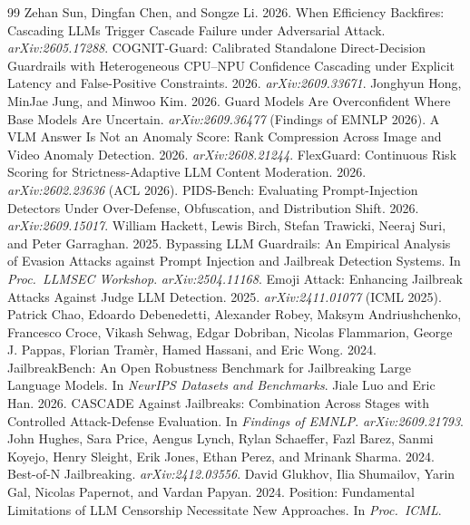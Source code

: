 \documentclass[11pt]{article}
\begin{document}
\begin{thebibliography}{99}
 Zehan Sun, Dingfan Chen, and Songze Li. 2026. When Efficiency Backfires: Cascading LLMs Trigger Cascade Failure under Adversarial Attack. \emph{arXiv:2605.17288}.
 COGNIT-Guard: Calibrated Standalone Direct-Decision Guardrails with Heterogeneous CPU--NPU Confidence Cascading under Explicit Latency and False-Positive Constraints. 2026. \emph{arXiv:2609.33671}.
 Jonghyun Hong, MinJae Jung, and Minwoo Kim. 2026. Guard Models Are Overconfident Where Base Models Are Uncertain. \emph{arXiv:2609.36477} (Findings of EMNLP 2026).
 A VLM Answer Is Not an Anomaly Score: Rank Compression Across Image and Video Anomaly Detection. 2026. \emph{arXiv:2608.21244}.
 FlexGuard: Continuous Risk Scoring for Strictness-Adaptive LLM Content Moderation. 2026. \emph{arXiv:2602.23636} (ACL 2026).
 PIDS-Bench: Evaluating Prompt-Injection Detectors Under Over-Defense, Obfuscation, and Distribution Shift. 2026. \emph{arXiv:2609.15017}.
 William Hackett, Lewis Birch, Stefan Trawicki, Neeraj Suri, and Peter Garraghan. 2025. Bypassing LLM Guardrails: An Empirical Analysis of Evasion Attacks against Prompt Injection and Jailbreak Detection Systems. In \emph{Proc.\ LLMSEC Workshop}. \emph{arXiv:2504.11168}.
 Emoji Attack: Enhancing Jailbreak Attacks Against Judge LLM Detection. 2025. \emph{arXiv:2411.01077} (ICML 2025).
 Patrick Chao, Edoardo Debenedetti, Alexander Robey, Maksym Andriushchenko, Francesco Croce, Vikash Sehwag, Edgar Dobriban, Nicolas Flammarion, George J. Pappas, Florian Tram\`er, Hamed Hassani, and Eric Wong. 2024. JailbreakBench: An Open Robustness Benchmark for Jailbreaking Large Language Models. In \emph{NeurIPS Datasets and Benchmarks}.
 Jiale Luo and Eric Han. 2026. CASCADE Against Jailbreaks: Combination Across Stages with Controlled Attack-Defense Evaluation. In \emph{Findings of EMNLP}. \emph{arXiv:2609.21793}.
 John Hughes, Sara Price, Aengus Lynch, Rylan Schaeffer, Fazl Barez, Sanmi Koyejo, Henry Sleight, Erik Jones, Ethan Perez, and Mrinank Sharma. 2024. Best-of-N Jailbreaking. \emph{arXiv:2412.03556}.
 David Glukhov, Ilia Shumailov, Yarin Gal, Nicolas Papernot, and Vardan Papyan. 2024. Position: Fundamental Limitations of LLM Censorship Necessitate New Approaches. In \emph{Proc.\ ICML}.
\end{thebibliography}
\end{document}
